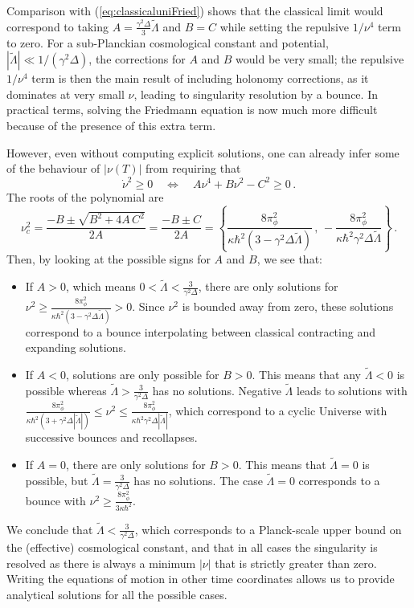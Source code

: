 \documentclass[aps,prd,11pt,showkeys,nofootinbib]{revtex4-2}
\begin{document}
Comparison with (\ref{eq:classicaluniFried}) shows that the classical limit would correspond to taking $A=\frac{\gamma^2\Delta}{3}\tilde\Lambda$ and $B=C$ while setting the repulsive $1/\nu^4$ term to zero. For a sub-Planckian cosmological constant and potential, $|\tilde\Lambda| \ll 1/(\gamma^2\Delta)$, the corrections for $A$ and $B$ would be very small; the repulsive  $1/\nu^4$ term is then the main result of including holonomy corrections, as it dominates at very small $\nu$, leading to singularity resolution by a bounce. In practical terms, solving the Friedmann equation is now much more difficult because of the presence of this extra term.


However, even without computing explicit solutions, one can already infer some of the behaviour of $|\nu(T)|$ from requiring that 
\begin{equation}
    \dot \nu^2 \geq 0 \quad \Leftrightarrow  \quad A\nu^4+B\nu^2-C^2\geq0\,.
\end{equation}
The roots of the polynomial are 
\begin{equation}
    \nu^2_c=\frac{-B\pm\sqrt{B^2+4A\,C^2}}{2A} =\frac{-B\pm C}{2A}= \left\{ \frac{8\pi_\phi^2}{\kappa\hbar^2(3-\gamma^2\Delta\tilde{\Lambda})} \,, \, -\frac{8\pi_\phi^2}{\kappa\hbar^2\gamma^2\Delta \tilde{\Lambda}} \right\}\,.
\end{equation}
Then, by looking at the possible signs for $A$ and $B$, we see that:
\begin{itemize}
    \item If $A>0$, which means $0 < \tilde\Lambda < \frac{3}{\gamma^2\Delta}$, there are only solutions for $\nu^2\geq \frac{8\pi_\phi^2}{\kappa\hbar^2(3-\gamma^2\Delta\tilde{\Lambda})}>0$. Since $\nu^2$ is bounded away from zero, these solutions correspond to a bounce interpolating between classical contracting and expanding solutions. 
    \item If $A<0$, solutions are only possible for  $B>0$. This means that any $\tilde\Lambda<0$ is possible whereas $\tilde\Lambda>\frac{3}{\gamma^2\Delta}$ has no solutions. Negative $\tilde\Lambda$ leads to solutions with $\frac{8\pi_\phi^2}{\kappa\hbar^2(3+\gamma^2\Delta|\tilde{\Lambda}|)}\leq \nu^2 \leq \frac{8\pi_\phi^2}{\kappa\hbar^2\gamma^2\Delta |\tilde{\Lambda}|}$, which correspond to a cyclic Universe with successive bounces and recollapses.
    \item If $A=0$, there are only solutions for $B > 0$. This means that $\tilde\Lambda=0$ is possible, but $\tilde\Lambda=\frac{3}{\gamma^2\Delta}$ has no solutions. The case $\tilde\Lambda=0$ corresponds to a bounce with $\nu^2 \geq \frac{8\pi_\phi^2}{3\kappa\hbar^2}$. 
\end{itemize}
We conclude that $\tilde{\Lambda} < \frac{3}{\gamma^2\Delta}$, which corresponds to a Planck-scale upper bound on the (effective) cosmological constant, and that in all cases the singularity is resolved as there is always a minimum $|\nu|$ that is strictly greater than zero. Writing the equations of motion in other time coordinates allows us to provide analytical solutions for all the possible cases.
\end{document}
